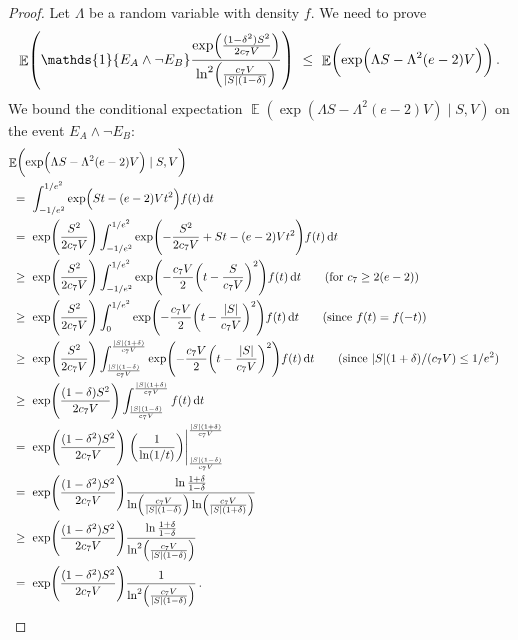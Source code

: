 \documentclass[11pt]{article}
\DeclareMathOperator{\E}{\mathbb{E}}
\theoremstyle{remark}
\theoremstyle{definition}
\newcommand\parens[1]{(#1)}
\newcommand\ind[1]{\ensuremath{\mathds{1}\{#1\}}}
\newcommand\Parens[1]{\mleft(#1\mright)}
\begin{document}
\begin{proof}
  Let $\Lambda$ be a random variable with density $f$.
  We need to prove
  \[
    \E\Parens{
      \ind{E_A \wedge \neg E_B}
      \frac{
        \exp\Parens{\frac{(1-\delta^2)S^2}{2c_7V}}
      }{
        \ln^2\Parens{\frac{c_7V}{|S|(1-\delta)}}
      }
    }
    \ \leq \
    \E\Parens{
      \exp\Parens{ \Lambda S - \Lambda^2 (e-2) V }
    }
    \,.
  \]
  We bound the conditional expectation $\E\parens{ \exp\parens{
  \Lambda S - \Lambda^2 (e-2) V } \mid S,V}$ on the event $E_A \wedge
  \neg E_B$:
  \begin{align*}
    \lefteqn{
      \E\Parens{
        \exp\Parens{ \Lambda S - \Lambda^2 (e-2) V }
        \mid S,V
      }
    } \\
    & \ = \
    \int_{-1/e^2}^{1/e^2}
    \exp\Parens{ S t - (e-2) V t^2 }
    f(t) \dif{t}
    \\
    & \ = \
    \exp\Parens{\frac{S^2}{2c_7V}}
    \int_{-1/e^2}^{1/e^2}
    \exp\Parens{
      -\frac{S^2}{2c_7V}
      + S t - (e-2) V t^2
    }
    f(t) \dif{t}
    \\
    & \ \geq \
    \exp\Parens{\frac{S^2}{2c_7V}}
    \int_{-1/e^2}^{1/e^2}
    \exp\Parens{
      -\frac{c_7V}{2}
      \Parens{ t - \frac{S}{c_7V} }^2
    }
    f(t) \dif{t}
    \qquad \text{(for $c_7 \geq 2(e-2)$)}
    \\
    & \ \geq \
    \exp\Parens{\frac{S^2}{2c_7V}}
    \int_0^{1/e^2}
    \exp\Parens{
      -\frac{c_7V}{2}
      \Parens{ t - \frac{|S|}{c_7V} }^2
    }
    f(t) \dif{t}
    \qquad \text{(since $f(t) = f(-t)$)}
    \\
    & \ \geq \
    \exp\Parens{\frac{S^2}{2c_7V}}
    \int_{\frac{|S|(1-\delta)}{c_7V}}^{\frac{|S|(1+\delta)}{c_7V}}
    \exp\Parens{
      -\frac{c_7V}{2}
      \Parens{ t - \frac{|S|}{c_7V} }^2
    }
    f(t) \dif{t}
    \qquad \text{(since $|S|(1+\delta)/(c_7V) \leq 1/e^2)$}
    \\
    & \ \geq \
    \exp\Parens{\frac{(1-\delta)S^2}{2c_7V}}
    \int_{\frac{|S|(1-\delta)}{c_7V}}^{\frac{|S|(1+\delta)}{c_7V}}
    f(t) \dif{t}
    \\
    & \ = \
    \exp\Parens{\frac{(1-\delta^2)S^2}{2c_7V}}
    \left.
    \Parens{
      \frac{1}{\ln(1/t)}
    }
    \right\vert_{\frac{|S|(1-\delta)}{c_7V}}^{\frac{|S|(1+\delta)}{c_7V}}
    \\
    & \ = \
    \exp\Parens{\frac{(1-\delta^2)S^2}{2c_7V}}
    \frac{\ln\frac{1+\delta}{1-\delta}}
    {\ln\Parens{\frac{c_7V}{|S|(1-\delta)}}\ln\Parens{\frac{c_7V}{|S|(1+\delta)}}}
    \\
    & \ \geq \
    \exp\Parens{\frac{(1-\delta^2)S^2}{2c_7V}}
    \frac{\ln\frac{1+\delta}{1-\delta}}
    {\ln^2\Parens{\frac{c_7V}{|S|(1-\delta)}}}
    \\
    & \ = \
    \exp\Parens{\frac{(1-\delta^2)S^2}{2c_7V}}
    \frac{1}{\ln^2\Parens{\frac{c_7V}{|S|(1-\delta)}}}
    \,.
    \qedhere
  \end{align*}
\end{proof}
\end{document}
